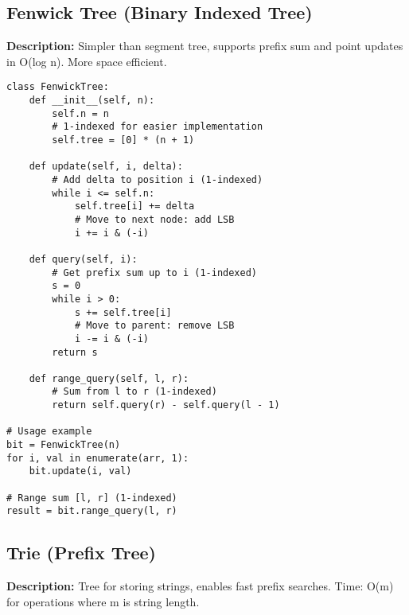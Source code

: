 \subsection{Fenwick Tree (Binary Indexed Tree)}
\textbf{Description:} Simpler than segment tree, supports prefix sum and point updates in O(log n). More space efficient.

\begin{lstlisting}
class FenwickTree:
    def __init__(self, n):
        self.n = n
        # 1-indexed for easier implementation
        self.tree = [0] * (n + 1)
    
    def update(self, i, delta):
        # Add delta to position i (1-indexed)
        while i <= self.n:
            self.tree[i] += delta
            # Move to next node: add LSB
            i += i & (-i)
    
    def query(self, i):
        # Get prefix sum up to i (1-indexed)
        s = 0
        while i > 0:
            s += self.tree[i]
            # Move to parent: remove LSB
            i -= i & (-i)
        return s
    
    def range_query(self, l, r):
        # Sum from l to r (1-indexed)
        return self.query(r) - self.query(l - 1)

# Usage example
bit = FenwickTree(n)
for i, val in enumerate(arr, 1):
    bit.update(i, val)

# Range sum [l, r] (1-indexed)
result = bit.range_query(l, r)
\end{lstlisting}

\subsection{Trie (Prefix Tree)}
\textbf{Description:} Tree for storing strings, enables fast prefix searches. Time: O(m) for operations where m is string length.

